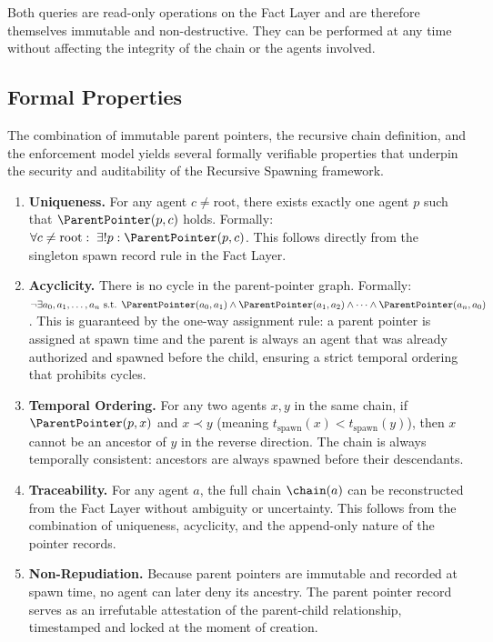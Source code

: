 Both queries are read-only operations on the Fact Layer and are therefore themselves immutable and non-destructive. They can be performed at any time without affecting the integrity of the chain or the agents involved.

\subsection{Formal Properties}

The combination of immutable parent pointers, the recursive chain definition, and the enforcement model yields several formally verifiable properties that underpin the security and auditability of the Recursive Spawning framework.

\begin{enumerate}
\item \textbf{Uniqueness.} For any agent $c \neq \text{root}$, there exists exactly one agent $p$ such that $\ParentPointer(p, c)$ holds. Formally: $\forall c \neq \text{root}: \; \exists! p: \ParentPointer(p, c)$. This follows directly from the singleton spawn record rule in the Fact Layer.

\item \textbf{Acyclicity.} There is no cycle in the parent-pointer graph. Formally: $\neg \exists a_0, a_1, \ldots, a_n \text{ s.t. } \ParentPointer(a_0, a_1) \land \ParentPointer(a_1, a_2) \land \cdots \land \ParentPointer(a_n, a_0)$. This is guaranteed by the one-way assignment rule: a parent pointer is assigned at spawn time and the parent is always an agent that was already authorized and spawned before the child, ensuring a strict temporal ordering that prohibits cycles.

\item \textbf{Temporal Ordering.} For any two agents $x, y$ in the same chain, if $\ParentPointer(p, x)$ and $x \prec y$ (meaning $t_{\text{spawn}}(x) < t_{\text{spawn}}(y)$), then $x$ cannot be an ancestor of $y$ in the reverse direction. The chain is always temporally consistent: ancestors are always spawned before their descendants.

\item \textbf{Traceability.} For any agent $a$, the full chain $\chain(a)$ can be reconstructed from the Fact Layer without ambiguity or uncertainty. This follows from the combination of uniqueness, acyclicity, and the append-only nature of the pointer records.

\item \textbf{Non-Repudiation.} Because parent pointers are immutable and recorded at spawn time, no agent can later deny its ancestry. The parent pointer record serves as an irrefutable attestation of the parent-child relationship, timestamped and locked at the moment of creation.
\end{enumerate}

